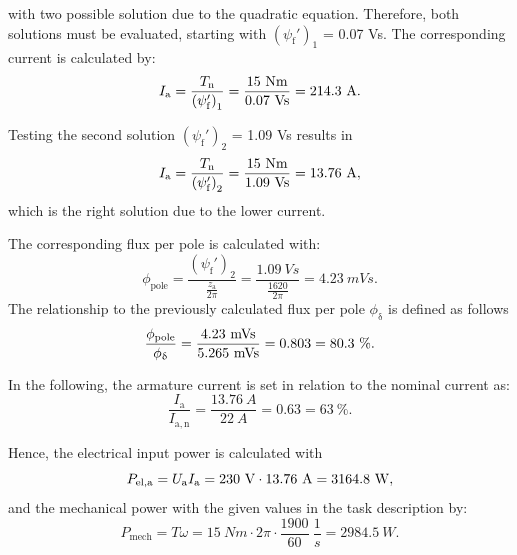 \begin{solutionblock}
	with two possible solution due to the quadratic equation. Therefore, both solutions must be evaluated, starting with $\left(\psi_{\mathrm{f}}' \right)_{\mathrm{1}}$ = 0.07 Vs. The corresponding current is calculated by:
	\begin{equation}
		I_{\mathrm{a}} = \frac{\Tn}{\left(\psi_{\mathrm{f}}' \right)_{\mathrm{1}}}
		= \frac{15 \ \si{Nm}}{0.07 \ \si{Vs}}
		= 214.3 \ \si{A}.
	\end{equation}

	Testing the second solution $\left(\psi_{\mathrm{f}}' \right)_{\mathrm{2}}$ = 1.09 Vs results in
	\begin{equation}
		I_{\mathrm{a}} = \frac{\Tn}{\left(\psi_{\mathrm{f}}' \right)_{\mathrm{2}}}
		= \frac{15 \ \si{Nm}}{1.09 \ \si{Vs}}
		= 13.76 \ \si{A},
	\end{equation}
	which is the right solution due to the lower current.

	The corresponding flux per pole is calculated with:
	\begin{equation}
		\phi_{\mathrm{pole}} = \frac{\left(\psi_{\mathrm{f}}' \right)_2 }{\frac{z_{\mathrm{a}}}{2\pi}}
		= \frac{1.09 \ \si{Vs}}{\frac{1620}{2 \pi}}
		= 4.23 \ \si{mVs}.
	\end{equation}
	The relationship to the previously calculated flux per pole $\phi_{\updelta}$ is defined as follows
	\begin{equation}
		\frac{\phi_{\mathrm{pole}}}{\phiDelta}
		= \frac{4.23 \ \si{mVs}}{5.265 \ \si{mVs}}
		= 0.803
		= 80.3 \ \%.
	\end{equation}

	In the following, the armature current is set in relation to the nominal current as:
	\begin{equation}
		\frac{I_{\mathrm{a}}}{I_{\mathrm{a,n}}}
		= \frac{13.76 \ \si{A}}{22 \ \si{A}}
		= 0.63
		= 63 \ \%.
	\end{equation}

	Hence, the electrical input power is calculated with
	\begin{equation}
		P_{\mathrm{el,a}} = U_{\mathrm{a}} \Ia
		= 230 \ \si{V} \cdot 13.76 \ \si{A}
		= 3164.8 \ \si{W},
	\end{equation}
	and the mechanical power with the given values in the task description by:
	\begin{equation}
		P_{\mathrm{mech}} = T \omega
		= 15 \ \si{Nm} \cdot 2 \pi \cdot \frac{1900}{60} \ \si{\frac{1}{s}}
		= 2984.5 \ \si{W}.
	\end{equation}


\end{solutionblock}
